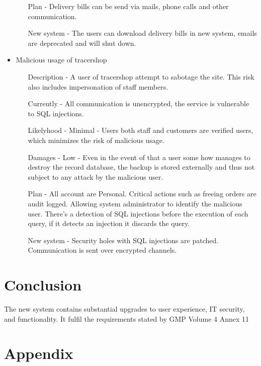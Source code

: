 \documentclass{article}
\begin{document}
\begin{itemize}
\begin{itemize}
    \item[Plan] - Delivery bills can be send via mails, phone calls and other communication.
    \item[New system] - The users can download delivery bills in new system, emails are deprecated and will shut down.
  \end{itemize}
  \item Malicious usage of tracershop
  \begin{itemize}
    \item[Description] - A user of tracershop attempt to sabotage the site. This risk also includes impersonation of staff members.
    \item[Currently] - All communication is unencrypted, the service is vulnerable to SQL injections.
    \item[Likelyhood] - Minimal - Users both staff and customers are verified users, which minimizes the risk of malicious usage.
    \item[Damages] - Low - Even in the event of that a user some how manages to destroy the record database, the backup is stored externally and thus not subject to any attack by the malicious user.
    \item[Plan] - All account are Personal. Critical actions such as freeing orders are audit logged. Allowing system administrator to identify the malicious user.
    There's a detection of SQL injections before the execution of each query, if it detects an injection it discards the query.
    \item[New system] - Security holes with SQL injections are patched. Communication is sent over encrypted channels.
  \end{itemize}
\end{itemize}


\section*{Conclusion}

The new system contains substantial upgrades to user experience, IT security,
and functionality. It fulfil the requirements stated by GMP Volume 4 Annex 11


\clearpage

\printglossary[type=main,style=long,nonumberlist]

\clearpage

\section*{Appendix}
\end{document}
